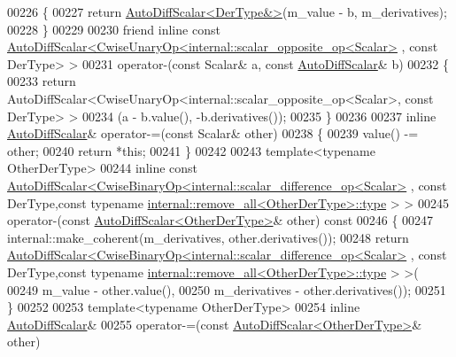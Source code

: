 \begin{DoxyCode}
00226 \textcolor{keyword}{    }\{
00227       \textcolor{keywordflow}{return} \hyperlink{class_eigen_1_1_auto_diff_scalar}{AutoDiffScalar<DerType&>}(m\_value - b, m\_derivatives);
00228     \}
00229 
00230     \textcolor{keyword}{friend} \textcolor{keyword}{inline} \textcolor{keyword}{const} 
      \hyperlink{class_eigen_1_1_auto_diff_scalar}{AutoDiffScalar<CwiseUnaryOp<internal::scalar\_opposite\_op<Scalar>}
      , \textcolor{keyword}{const} DerType> >
00231     operator-(\textcolor{keyword}{const} Scalar& a, \textcolor{keyword}{const} \hyperlink{class_eigen_1_1_auto_diff_scalar}{AutoDiffScalar}& b)
00232     \{
00233       \textcolor{keywordflow}{return} AutoDiffScalar<CwiseUnaryOp<internal::scalar\_opposite\_op<Scalar>, \textcolor{keyword}{const} DerType> >
00234             (a - b.value(), -b.derivatives());
00235     \}
00236 
00237     \textcolor{keyword}{inline} \hyperlink{class_eigen_1_1_auto_diff_scalar}{AutoDiffScalar}& operator-=(\textcolor{keyword}{const} Scalar& other)
00238     \{
00239       value() -= other;
00240       \textcolor{keywordflow}{return} *\textcolor{keyword}{this};
00241     \}
00242 
00243     \textcolor{keyword}{template}<\textcolor{keyword}{typename} OtherDerType>
00244     \textcolor{keyword}{inline} \textcolor{keyword}{const} 
      \hyperlink{class_eigen_1_1_auto_diff_scalar}{AutoDiffScalar<CwiseBinaryOp<internal::scalar\_difference\_op<Scalar>}
      , \textcolor{keyword}{const} DerType,\textcolor{keyword}{const} \textcolor{keyword}{typename} \hyperlink{group___sparse_core___module}{internal::remove\_all<OtherDerType>::type}
      > >
00245     operator-(\textcolor{keyword}{const} \hyperlink{class_eigen_1_1_auto_diff_scalar}{AutoDiffScalar<OtherDerType>}& other)\textcolor{keyword}{ const}
00246 \textcolor{keyword}{    }\{
00247       internal::make\_coherent(m\_derivatives, other.derivatives());
00248       \textcolor{keywordflow}{return} \hyperlink{class_eigen_1_1_auto_diff_scalar}{AutoDiffScalar<CwiseBinaryOp<internal::scalar\_difference\_op<Scalar>}
      , \textcolor{keyword}{const} DerType,\textcolor{keyword}{const} \textcolor{keyword}{typename} \hyperlink{group___sparse_core___module}{internal::remove\_all<OtherDerType>::type}
      > >(
00249         m\_value - other.value(),
00250         m\_derivatives - other.derivatives());
00251     \}
00252 
00253     \textcolor{keyword}{template}<\textcolor{keyword}{typename} OtherDerType>
00254     \textcolor{keyword}{inline} \hyperlink{class_eigen_1_1_auto_diff_scalar}{AutoDiffScalar}&
00255     operator-=(\textcolor{keyword}{const} \hyperlink{class_eigen_1_1_auto_diff_scalar}{AutoDiffScalar<OtherDerType>}& other)

\end{DoxyCode}
